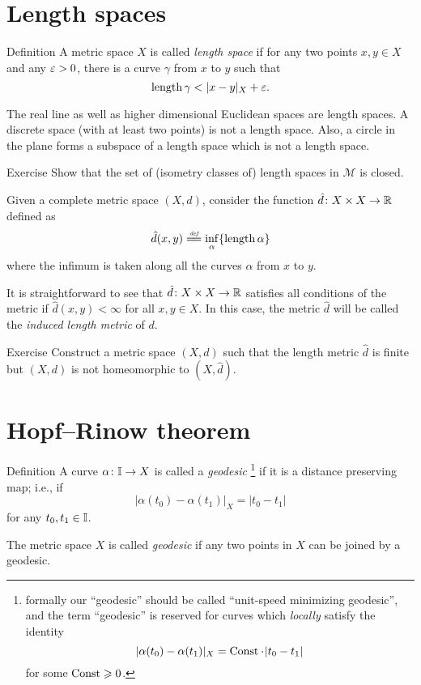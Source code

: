 \section{Length spaces}%

\begin{thm}{Definition}
A metric space $X$ is called \emph{length space} if for any two points $x,y\in X$ and any $\varepsilon>0$, there is a curve $\gamma$ from $x$ to $y$ such that
$$\length \gamma<|x-y|_X+\eps.$$

\end{thm}

 The real line as well as higher dimensional Euclidean spaces are length spaces.
A discrete space (with at least two points) is not a length space.
Also, a circle in the plane forms a subspace of a length space which is not a length space.

\begin{thm}{Exercise}\label{ex:length=closed-in-GH}
Show that the set of (isometry classes of) length spaces in $\mathcal{M}$ is closed. 
\end{thm}



Given a complete metric space $(X,d)$, 
consider the function $\hat d\:X\z\times X\to\RR$ defined as
$$\hat d(x,y)\df\inf_\alpha\{\length\alpha\}$$
where the infimum is taken along all the curves $\alpha$ from $x$ to $y$.

It is straightforward to see that $\hat d\colon X\times X\to\mathbb{R}$ satisfies all conditions of the metric if $\hat d(x,y)<\infty$ for all $x,y\in X$.
In this case, the metric $\hat d$ will be called the \emph{induced length metric} of $d$.

\begin{thm}{Exercise}\label{ex:length-is-not-homeo}
Construct a metric space $(X,d)$ such that the length  metric $\hat d$ is finite
but $(X,d)$ is not homeomorphic to $(X,\hat d)$.
\end{thm}


 
\section{Hopf--Rinow theorem}

\begin{thm}{Definition}\label{def:geodesic}
 A curve $\alpha\colon\mathbb{I}\to X$ is called a \emph{geodesic}%
\footnote{formally our ``geodesic'' should be called ``unit-speed minimizing geodesic'',
and the term ``geodesic'' is reserved for curves which \emph{locally} satisfy the identity
$$|\alpha(t_0)-\alpha(t_1)|_X=\Const\cdot|t_0-t_1|$$
for some $\operatorname{Const}\geqslant 0$.}
 if it is a distance preserving map;
i.e., if 
$$|\alpha(t_0)-\alpha(t_1)|_X=|t_0-t_1|$$
for any $t_0,t_1\in\mathbb{I}$.

The metric space $X$ is called \emph{geodesic}
if any two points in $X$ can be joined by a geodesic. 
\end{thm}





